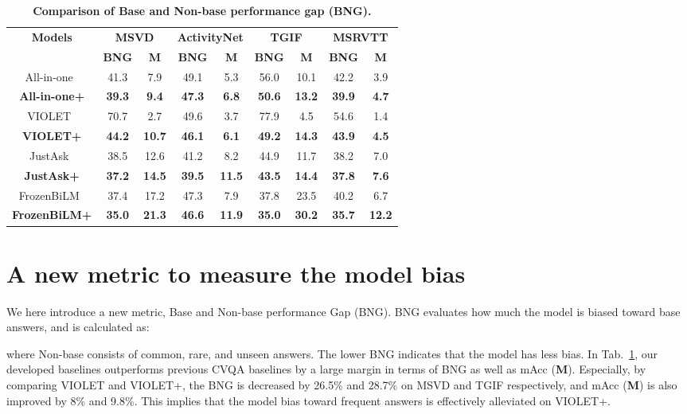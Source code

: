 \documentclass[10pt,twocolumn,letterpaper]{article}
\begin{document}
 \begin{table}[t!]
    \centering
    \setlength{\tabcolsep}{3.5pt}
    \begin{adjustbox}{width=\linewidth}
    \begin{tabular}{c|c c|c c|c c|c c}
        \toprule
        \textbf{Models} & \multicolumn{2}{c|}{\textbf{MSVD}} & \multicolumn{2}{c|}{\textbf{ActivityNet}} & \multicolumn{2}{c|}{\textbf{TGIF}} & \multicolumn{2}{c}{\textbf{MSRVTT}} \\
        & \textbf{BNG} & \textbf{M} & \textbf{BNG} & \textbf{M} & \textbf{BNG} & \textbf{M} & \textbf{BNG} & \textbf{M} \\
        \midrule
        \midrule
        All-in-one~\cite{wang2022all} & 41.3 & 7.9 & 49.1 & 5.3 & 56.0 & 10.1 & 42.2 & 3.9 \\
        \textbf{All-in-one+} & \textbf{39.3} & \textbf{9.4} & \textbf{47.3} & \textbf{6.8} & \textbf{50.6} & \textbf{13.2} & \textbf{39.9} & \textbf{4.7} \\
        \midrule
        VIOLET~\cite{fu2021violet} & 70.7 & 2.7 & 49.6 & 3.7 & 77.9 & 4.5 & 54.6 & 1.4 \\
        \textbf{VIOLET+} & \textbf{44.2} & \textbf{10.7} & \textbf{46.1} & \textbf{6.1} &  \textbf{49.2} & \textbf{14.3} & \textbf{43.9} & \textbf{4.5} \\
        \midrule
        JustAsk~\cite{yang2021just} & 38.5 & 12.6 & 41.2 & 8.2 & 44.9 & 11.7 & 38.2 & 7.0 \\
        \textbf{JustAsk+} & \textbf{37.2} & \textbf{14.5} & \textbf{39.5} & \textbf{11.5} & \textbf{43.5} & \textbf{14.4} & \textbf{37.8} & \textbf{7.6} \\
        \midrule
        FrozenBiLM~\cite{yang2022zero} & 37.4 & 17.2 & 47.3 & 7.9 & 37.8 & 23.5 & 40.2 & 6.7 \\
        \textbf{FrozenBiLM+} & \textbf{35.0} & \textbf{21.3} & \textbf{46.6} & \textbf{11.9} & \textbf{35.0} & \textbf{30.2} & \textbf{35.7} & \textbf{12.2} \\
        \bottomrule
    \end{tabular}
    \end{adjustbox}
    \caption{\textbf{Comparison of Base and Non-base performance gap (BNG).}
    }
    \label{tab:bng}
\end{table} \section{A new metric to measure the model bias}

We here introduce a new metric, Base and Non-base performance Gap (BNG).
BNG evaluates how much the model is biased toward base answers, and is calculated as:

where Non-base consists of common, rare, and unseen answers.
The lower BNG indicates that the model has less bias.
In Tab.~\ref{tab:bng}, our developed baselines outperforms previous CVQA baselines by a large margin in terms of BNG as well as mAcc (\textbf{M}).
Especially, by comparing VIOLET and VIOLET+, the BNG is decreased by 26.5\% and 28.7\% on MSVD and TGIF respectively, and mAcc (\textbf{M}) is also improved by 8\% and 9.8\%.
This implies that the model bias toward frequent answers is effectively alleviated on VIOLET+.
 
\end{document}
